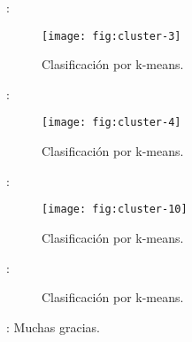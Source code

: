 \begin{frame}{\secname : \subsecname}
  \begin{figure}
    \centering
    \texttt{[image: fig:cluster-3]}
    \caption{Clasificación por k-means.}
    \label{}
  \end{figure}
\end{frame}

\begin{frame}{\secname : \subsecname}
  \begin{figure}
    \centering
    \texttt{[image: fig:cluster-4]}
    \caption{Clasificación por k-means.}
    \label{}
  \end{figure}
\end{frame}

\begin{frame}{\secname : \subsecname}
  \begin{figure}
    \centering
    \texttt{[image: fig:cluster-10]}
    \caption{Clasificación por k-means.}
    \label{}
  \end{figure}
\end{frame}

\begin{frame}{\secname : \subsecname}
  \begin{figure}
    \centering
    \hspace{1cm}
    \caption{Clasificación por k-means.}
    \label{}
  \end{figure}
\end{frame}




\begin{frame}{\secname : \subsecname}
Muchas gracias.
\end{frame}
